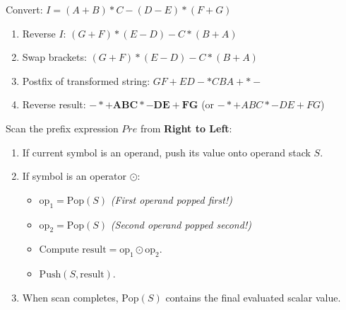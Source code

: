 \documentclass[12pt,a4paper]{article}
\begin{document}
\begin{tcolorbox}[examplebox, title={\textbf{Example: Infix to Prefix Conversion}}]
Convert: $I = (A + B) * C - (D - E) * (F + G)$
\begin{enumerate}[leftmargin=*, nosep]
  \item Reverse $I$: $(G + F) * (E - D) - C * (B + A)$
  \item Swap brackets: $(G + F) * (E - D) - C * (B + A)$
  \item Postfix of transformed string: $G F + E D - * C B A + * -$
  \item Reverse result: $\mathbf{- * + A B C * - D E + F G}$ (or $- * + A B C * - D E + F G$)
\end{enumerate}
\end{tcolorbox}

\begin{tcolorbox}[formulabox, title={\textbf{Prefix Expression Evaluation Algorithm}}]
Scan the prefix expression $Pre$ from \textbf{Right to Left}:
\begin{enumerate}[leftmargin=*, nosep]
  \item If current symbol is an operand, push its value onto operand stack $S$.
  \item If symbol is an operator $\odot$:
  \begin{itemize}[leftmargin=*, nosep]
    \item $\text{op}_1 = \text{Pop}(S)$ \quad \textit{(First operand popped first!)}
    \item $\text{op}_2 = \text{Pop}(S)$ \quad \textit{(Second operand popped second!)}
    \item Compute $\text{result} = \text{op}_1 \odot \text{op}_2$.
    \item $\text{Push}(S, \text{result})$.
  \end{itemize}
  \item When scan completes, $\text{Pop}(S)$ contains the final evaluated scalar value.
\end{enumerate}
\end{tcolorbox}
\end{document}
